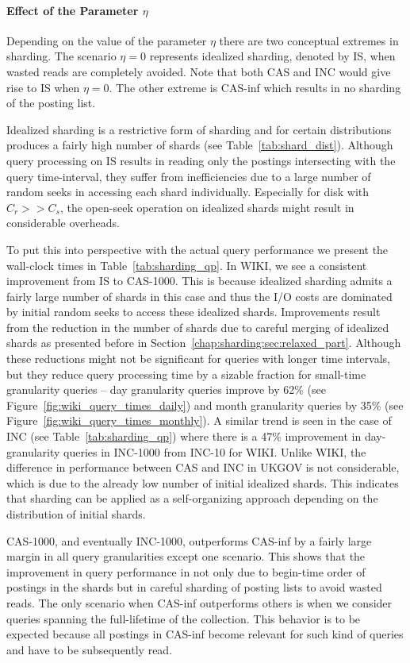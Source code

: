 \paragraph{Effect of the Parameter $\eta$}  Depending on the value of the parameter $\eta$ there are two conceptual extremes in sharding. The scenario $\eta = 0$ represents idealized sharding, denoted by IS, when wasted reads are completely avoided. Note that both CAS and INC would give rise to IS when $\eta = 0$. The other extreme is CAS-inf which results in no sharding of the posting list.  

Idealized sharding is a restrictive form of sharding and for certain distributions produces a fairly high number of shards (see Table~\ref{tab:shard_dist}). Although query processing on IS results in reading only the postings intersecting with the query time-interval, they suffer
from inefficiencies due to a large number of random seeks in accessing each shard individually. Especially
for disk with $C_r >> C_s$, the open-seek operation on idealized
shards might result in considerable overheads. 

To put this into perspective with the actual query performance we present the wall-clock times in Table~\ref{tab:sharding_qp}. In WIKI, we see a consistent improvement from IS to CAS-1000. This is
because idealized sharding admits a fairly large number of shards in
this case and thus the I/O costs are dominated by initial random seeks
to access these idealized shards. Improvements result from the
reduction in the number of shards due to careful merging of idealized
shards as presented before in Section~\ref{chap:sharding:sec:relaxed_part}. Although
these reductions might not be significant for queries with longer
time intervals, but they reduce query processing time by a sizable
fraction for small-time granularity queries -- day granularity queries improve by
62\% (see Figure~\ref{fig:wiki_query_times_daily}) and month granularity queries by
35\% (see Figure~\ref{fig:wiki_query_times_monthly}). A similar trend is seen in the case of INC (see Table~\ref{tab:sharding_qp}) where there is a 47\% improvement in day-granularity queries in INC-1000 from INC-10 for WIKI. Unlike WIKI, the  difference in performance between CAS and INC in UKGOV is not considerable, which is due
to the already low number of initial idealized shards. This indicates
that sharding can be applied as a self-organizing approach
depending on the distribution of initial shards. 

CAS-1000, and eventually INC-1000, outperforms CAS-inf by a fairly large margin in all
query granularities except one scenario. This shows that the improvement in query performance in not only due to begin-time order of postings in the shards but in careful sharding of posting lists to avoid wasted reads. The only scenario when CAS-inf outperforms others is when we consider queries spanning the full-lifetime of the collection. This behavior is to be expected because all postings in CAS-inf
become relevant for such kind of queries and have to be subsequently
read. 

